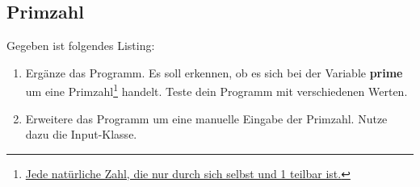 \subsection{Primzahl }
Gegeben ist folgendes Listing:
\begin{enumerate}
    \item Ergänze das Programm. Es soll erkennen, ob es sich bei der Variable \textbf{prime} um eine Primzahl\footnote{\href{https://de.wikipedia.org/wiki/Primzahl}{Jede natürliche Zahl, die nur durch sich selbst und 1 teilbar ist.}} handelt. Teste dein Programm mit verschiedenen Werten.
    \item Erweitere das Programm um eine manuelle Eingabe der Primzahl. Nutze dazu die Input-Klasse.
\end{enumerate}
